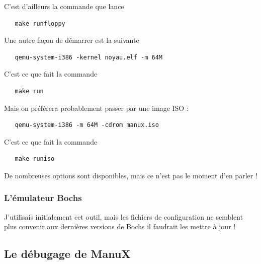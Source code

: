   C'est d'ailleurs la commande que lance

\begin{lstlisting}
   make runfloppy
\end{lstlisting}

   Une autre façon de démarrer \manux est la suivante

\begin{lstlisting}
   qemu-system-i386 -kernel noyau.elf -m 64M
\end{lstlisting}

  C'est ce que fait la commande

\begin{lstlisting}
   make run
\end{lstlisting}

   Mais on préférera probablement passer par une image ISO :

\begin{lstlisting}
   qemu-system-i386 -m 64M -cdrom manux.iso
\end{lstlisting}

  C'est ce que fait la commande

\begin{lstlisting}
   make runiso
\end{lstlisting}

   De nombreuses options sont disponibles, mais ce n'est pas le moment
d'en parler !

%
\subsubsection{L'émulateur Bochs}

   J'utilisais initialement cet outil, mais les fichiers de
configuration ne semblent plus convenir aux dernières versions de
Bochs {} \cite{bochs-website} il faudrait les mettre à jour !

%
\subsection{Le débugage de ManuX}

%
